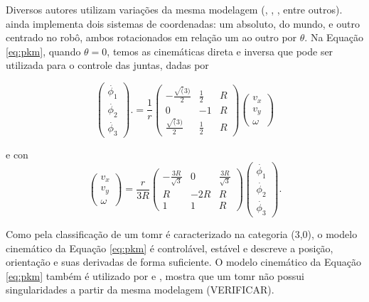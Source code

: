 Diversos autores utilizam variações da mesma modelagem (\cite{rojas2006holonomic}, \cite{ritter2016modelagem}, \cite{pin1994new}, entre outros). \cite{ritter2016modelagem} ainda implementa dois sistemas de coordenadas: um absoluto, do mundo, e outro centrado no robô, ambos rotacionados em relação um ao outro por $\theta$. Na Equação \ref{eq:pkm}, quando $\theta = 0$, temos as cinemáticas direta e inversa que pode ser utilizada para o controle das juntas, dadas por

\begin{equation}
  \begin{pmatrix}
    \dot{\phi_1} \\
    \dot{\phi_2} \\
    \dot{\phi_3}
  \end{pmatrix}.
  =
  \frac{1}{r}
  \begin{pmatrix}
    -\frac{\sqrt(3)}{2} & \frac{1}{2} & R \\
    0                   & -1          & R \\
    \frac{\sqrt(3)}{2}  & \frac{1}{2} & R
  \end{pmatrix}
  \begin{pmatrix}
    v_x \\
    v_y \\
    \omega
  \end{pmatrix}
  \label{eq:ik}
\end{equation}

e
con
\begin{equation}
  \begin{pmatrix}
    v_x \\
    v_y \\
    \omega
  \end{pmatrix}
  =
  \frac{r}{3R}
  \begin{pmatrix}
    -\frac{3R}{\sqrt{3}} & 0   & \frac{3R}{\sqrt{3}} \\
    R                    & -2R & R                   \\
    1                    & 1   & R
  \end{pmatrix}
  \begin{pmatrix}
    \dot{\phi_1} \\
    \dot{\phi_2} \\
    \dot{\phi_3}
  \end{pmatrix}.
  \label{eq:dk}
\end{equation}


Como pela classificação de \cite{campion1996structural} um \acrshort{tomr} é caracterizado na categoria (3,0), o modelo cinemático da Equação \ref{eq:pkm} é controlável, estável e descreve a posição, orientação e suas derivadas de forma suficiente. O modelo cinemático da Equação \ref{eq:pkm} também é utilizado por \cite{rojas2006holonomic} e \cite{ritter2016modelagem}, \cite{loh2003mechatronics} mostra que um \acrshort{tomr} não possui singularidades a partir da mesma modelagem (VERIFICAR).


